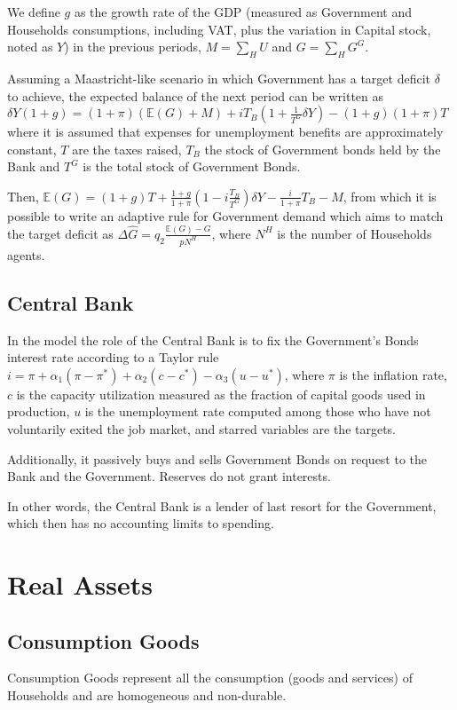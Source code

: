 \documentclass[a4paper, headings=standardclasses]{scrartcl}
\begin{document}
We define $g$ as the growth rate of the GDP (measured as Government and Households consumptions, including VAT, plus the variation in Capital stock, noted as $Y$) in the previous periods, $M = \sum_H U$ and $G = \sum_H G^G$.

Assuming a Maastricht-like scenario in which Government has a target deficit $\delta$ to achieve, the expected balance of the next period can be written as $\delta Y (1+g) = (1+\pi) (\mathbb{E}(G) + M) + i T_B(1 + \frac{1}{T^G} \delta Y) - (1+g)(1+\pi) T$ where it is assumed that expenses for unemployment benefits are approximately constant, $T$ are the taxes raised, $T_B$ the stock of Government bonds held by the Bank and $T^G$ is the total stock of Government Bonds.

Then, $\mathbb{E}(G) = (1+g) T + \frac{1+g}{1+\pi}(1-i\frac{T_B}{T^G})\delta Y - \frac{i}{1+\pi}T_B - M$, from which it is possible to write an adaptive rule for Government demand which aims to match the target deficit as $\Delta \hat{G} = q_2 \frac{\mathbb{E}(G)-G}{p N^H}$, where $N^H$ is the number of Households agents.


\subsection{Central Bank}
In the model the role of the Central Bank is to fix the Government's Bonds interest rate according to a Taylor rule $i = \pi + \alpha_1 (\pi - \pi^*) + \alpha_2 (c - c^*) - \alpha_3 (u - u^*)$, where $\pi$ is the inflation rate, $c$ is the capacity utilization measured as the fraction of capital goods used in production, $u$ is the unemployment rate computed among those who have not voluntarily exited the job market, and starred variables are the targets.

Additionally, it passively buys and sells Government Bonds on request to the Bank and the Government. Reserves do not grant interests.

In other words, the Central Bank is a lender of last resort for the Government, which then has no accounting limits to spending.

\section{Real Assets}
\subsection{Consumption Goods}
Consumption Goods represent all the consumption (goods and services) of Households and are homogeneous and non-durable.
\end{document}
